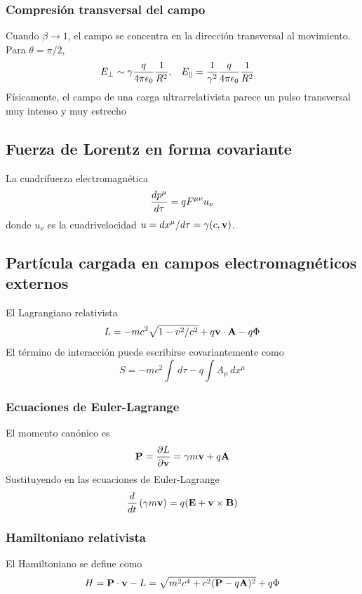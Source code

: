 \documentclass[]{article}
\numberwithin{equation}{section}
\begin{document}
\subsubsection{Compresión transversal del campo}
Cuando $\beta \to 1$, el campo se concentra en la dirección transversal al movimiento. Para $\theta = \pi/2$,
\begin{align}
	E_\perp &\sim \gamma \ke[q]\frac{1}{R^2}, & E_\parallel &= \frac{1}{\gamma^2} \ke[q]\frac{1}{R^2}
\end{align}
Físicamente, el campo de una carga ultrarrelativista parece un pulso transversal muy intenso y muy estrecho

\subsection{Fuerza de Lorentz en forma covariante}
La cuadrifuerza electromagnética
\begin{equation}
	\dfrac{d p^\mu}{d \tau} = q F^{\mu\nu} u_\nu
\end{equation}
donde $u_\nu$ es la cuadrivelocidad $u = d x^\mu/d \tau = \gamma (c,\mathbf{v})$. 

\subsection{Partícula cargada en campos electromagnéticos externos}
El Lagrangiano relativista 
\begin{equation}
	L = -mc^2 \sqrt{1 - v^2/c^2} + q\mathbf{v}\cdot\mathbf{A} - q\Phi
\end{equation}
El término de interacción puede escribirse covariantemente como
\begin{equation}
	S = -mc^2\int \, d\tau - q\int A_\mu \, dx^\mu
\end{equation}

\subsubsection{Ecuaciones de Euler-Lagrange}
El momento canónico es
\begin{equation}
	\mathbf{P} = \dfrac{\partial L}{\partial \mathbf{v}} = \gamma m \mathbf{v} + q\mathbf{A}
\end{equation}
Sustituyendo en las ecuaciones de Euler-Lagrange 
\begin{equation}
	\dfrac{d }{d t} \left(\gamma m \mathbf{v}\right) = q(\mathbf{E} + \mathbf{v}\times\mathbf{B})
\end{equation}

\subsubsection{Hamiltoniano relativista}
El Hamiltoniano se define como
\begin{equation}
	H = \mathbf{P}\cdot\mathbf{v} - L = \sqrt{m^2 c^4 + c^2 (\mathbf{P} - q\mathbf{A})^2} + q\Phi
\end{equation}
\end{document}
